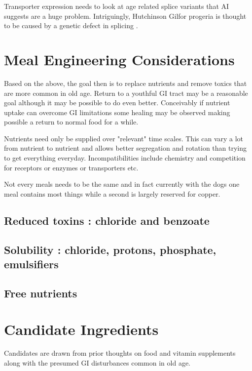 Transporter expression needs to look at age related splice variants that
AI suggests are a huge problem.
Intriguingly, Hutchinson Gilfor progeria is thought to be caused
by a genetic defect in splicing 
\cite{Li_Wang_Ma_Alternative_splicing_aging_2017}.




\section{Meal Engineering Considerations }

Based on the above, the goal then is to replace nutrients
and remove toxics that are more common in old age. Return to a
youthful GI tract may be a reasonable goal although it may be
possible to do even better. Conceivably if nutrient uptake can
overcome GI limitations some healing may be observed
making possible a return to normal food for a while.

Nutrients need only be supplied over "relevant" time scales.
This can vary a lot from nutrient to nutrient and allows 
better segregation and rotation than trying to get everything
everyday. Incompatibilities include chemistry and competition
for receptors or enzymes or transporters etc.

Not every meals needs to be the same and in fact currently
with the dogs one meal contains most things while a second
is largely reserved for copper. 

\subsection{ Reduced toxins : chloride and benzoate}

\subsection{ Solubility : chloride, protons, phosphate, emulsifiers}

\subsection{ Free nutrients }


\section{Candidate Ingredients}

Candidates are drawn from prior thoughts on food and
vitamin supplements along with the presumed GI disturbances
common in old age.

